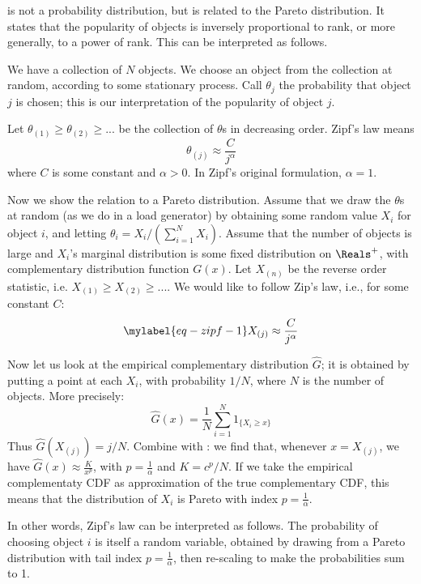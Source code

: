  is not a probability
distribution, but is related to the Pareto
distribution. It states that the popularity of
objects is inversely proportional to rank, or
more generally, to a power of rank. This can be
interpreted as follows.

We have a collection of $N$ objects. We choose an
object from the collection at random, according
to some stationary process. Call $\theta_j$ the
probability that object $j$ is chosen; this is
our interpretation of the popularity of object
$j$.

Let $\theta_{(1)}\geq \theta_{(2)} \geq ...$ be
the collection of $\theta$s in decreasing order.
Zipf's law means
 $$
 \theta_{(j)} \approx \frac{C}{j^{\alpha}}
 $$
where $C$ is some constant and $\alpha>0$. In
Zipf's original formulation, $\alpha=1$.

Now we show the relation to a Pareto
distribution. Assume that we draw the $\theta$s
at random (as we do in a load generator) by
obtaining some random value $X_i$ for object $i$,
and letting $\theta_i = X_i/(\sum_{i=1}^N X_i)$.
Assume that the number of objects is large and
$X_i$'s marginal distribution is some fixed
distribution on $\Reals^+$, with complementary
distribution function $G(x)$. Let $X_{(n)}$ be
the reverse order statistic, i.e.
 $X_{(1)}\geq X_{(2)}\geq ...$. We would like to follow Zip's law, i.e., for some constant $C$:
\begin{equation}\mylabel{eq-zipf-1}
  X_{(j)}\approx \frac{C}{j^{\alpha}}
\end{equation}

Now let us look at the empirical complementary
distribution $\hat{G}$; it is obtained by putting
a point at each $X_i$, with probability $1/N$,
where $N$ is the number of objects. More
precisely:
$$\hat{G}(x) =\frac{1}{N}\sum_{i=1}^N 1_{\{X_i \geq x\}}
$$
Thus $\hat{G}(X_{(j)})=j/N$. Combine with
: we find that, whenever
$x=X_{(j)}$, we have $ \hat{G}(x) \approx
\frac{K}{x^p} $,  with $p=\frac{1}{\alpha}$ and
$K=c^{p}/N$. If we take the empirical
complementaty CDF as approximation of the true
complementary CDF, this means that the
distribution of $X_i$ is Pareto with index
$p=\frac{1}{\alpha}$.

In other words, Zipf's law can be interpreted as
follows. The probability of choosing object $i$
is itself a random variable, obtained by drawing
from a Pareto distribution with tail index
$p=\frac{1}{\alpha}$, then re-scaling to make the
probabilities sum to 1.

